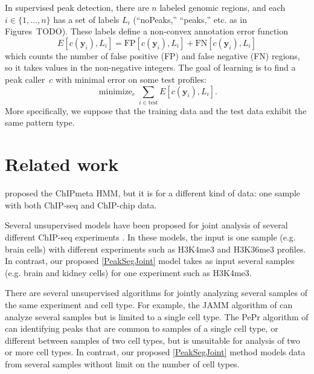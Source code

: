 \documentclass{article} %
\DeclareMathOperator*{\minimize}{minimize}
\begin{document}
In supervised peak detection, there are $n$ labeled genomic regions,
and each $i\in\{1, \dots, n\}$ has a set of labels $L_i$ (``noPeaks,''
``peaks,'' etc. as in Figures~TODO). These labels define a non-convex
annotation error function
\begin{equation}
  \label{eq:error}
  E[c(\mathbf y_i),  L_i] =
  \text{FP}[c(\mathbf y_i), L_i] +
  \text{FN}[c(\mathbf y_i), L_i]
\end{equation}
which counts the number of false positive (FP) and false negative (FN)
regions, so it takes values in the non-negative integers. The goal of
learning is to find a peak caller~$c$ with minimal error on some test
profiles:
\begin{equation}
  \label{eq:min_error}
  \minimize_c \sum_{i\in\text{test}} E[c(\mathbf y_i),  L_i].
\end{equation}
More specifically, we suppose that the training data and the test data
exhibit the same pattern type.
\section{Related work}

\citet{hierarchical-joint} proposed the ChIPmeta HMM, but it is for a
different kind of data: one sample with both ChIP-seq and ChIP-chip
data.

Several unsupervised models have been proposed for joint analysis of
several different ChIP-seq experiments
\citep{jmosaics,segway,chromhmm}. In these models, the input is one
sample (e.g. brain cells) with different experiments such as H3K4me3
and H3K36me3 profiles. In contrast, our proposed \ref{PeakSegJoint} model
takes as input several samples (e.g. brain and kidney cells) for one
experiment such as H3K4me3.

There are several unsupervised algorithms for jointly analyzing
several samples of the same experiment and cell type. For example, the
JAMM algorithm of \citet{JAMM} can analyze several samples but is
limited to a single cell type. 
The PePr algorithm of \citet{PePr} can identifying peaks that are
common to samples of a single cell type, or different between samples
of two cell types, but is unsuitable for analysis of two or more cell
types. In contrast, our proposed \ref{PeakSegJoint} method models data from
several samples without limit on the number of cell types.
\end{document}
